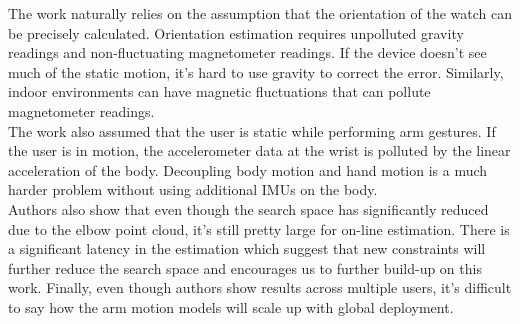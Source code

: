 \documentclass[a4paper]{article}
\begin{document}
The work naturally relies on the assumption that the orientation of the watch can be precisely calculated. Orientation estimation requires unpolluted gravity readings and non-fluctuating magnetometer readings. If the device doesn't see much of the static motion, it's hard to use gravity to correct the error. Similarly, indoor environments can have magnetic fluctuations that can pollute magnetometer readings.\\

The work also assumed that the user is static while performing arm gestures. If the user is in motion, the accelerometer data at the wrist is polluted by the linear acceleration of the body. Decoupling body motion and hand motion is a much harder problem without using additional IMUs on the body. \\

Authors also show that even though the search space has significantly reduced due to the elbow point cloud, it's still pretty large for on-line estimation. There is a significant latency in the estimation which suggest that new constraints will further reduce the search space and encourages us to further build-up on this work. Finally, even though authors show results across multiple users, it's difficult to say how the arm motion models will scale up with global deployment. \\
 
 






 






 
\end{document}
